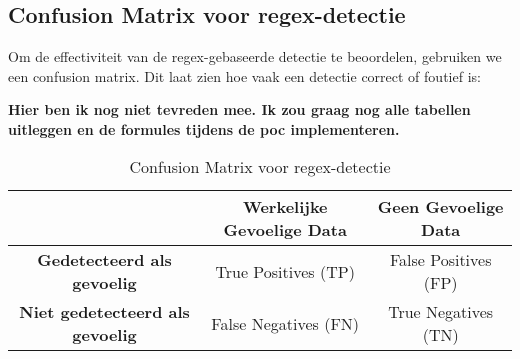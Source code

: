 


\section{}
\label{sec:evaluatie_detectie}

\subsection{Confusion Matrix voor regex-detectie}
Om de effectiviteit van de regex-gebaseerde detectie te beoordelen, gebruiken we een confusion matrix. Dit laat zien hoe vaak een detectie correct of foutief is:

\textbf{Hier ben ik nog niet tevreden mee. Ik zou graag nog alle tabellen uitleggen en de formules tijdens de poc implementeren.}

\begin{table}[h]
    \centering
    \small
    \scriptsize
    \begin{tabular}{|c|c|c|}
        \hline
        \textbf{} & \textbf{Werkelijke Gevoelige Data} & \textbf{Geen Gevoelige Data} \\ \hline
        \textbf{Gedetecteerd als gevoelig} & True Positives (TP) & False Positives (FP) \\ \hline
        \textbf{Niet gedetecteerd als gevoelig} & False Negatives (FN) & True Negatives (TN) \\ \hline
    \end{tabular}
    \caption{Confusion Matrix voor regex-detectie}
    \label{tab:confusion_matrix}
\end{table}

